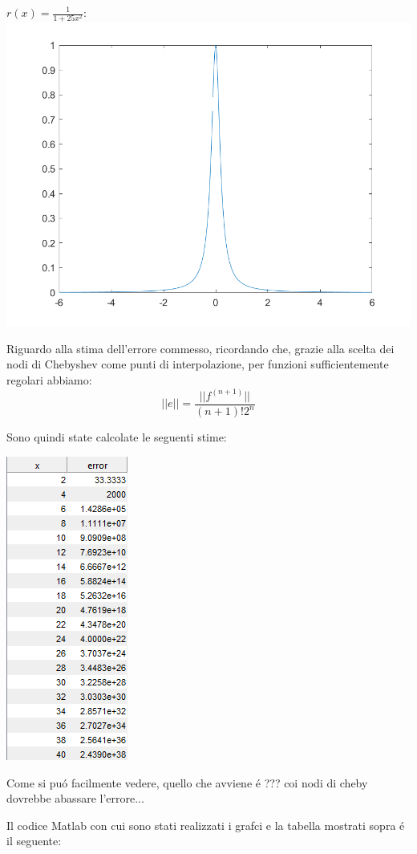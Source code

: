 \begin{center}
\scriptsize{\(r(x) = \frac{1}{1+25x^2}\):}\\
\includegraphics[scale=0.45]{cap4/4_7/runge.png}
\end{center}


\noindent Riguardo alla stima dell'errore commesso, ricordando che, grazie alla scelta dei nodi di Chebyshev come punti di interpolazione, per funzioni sufficientemente regolari abbiamo:
\[
||e|| = \frac{||f^{(n+1)}||}{(n+1)!2^n}
\]

\noindent Sono quindi state calcolate le seguenti stime:

\begin{center}
	\includegraphics[scale=0.5]{cap4/4_7/4_7_error.png}
\end{center}

\noindent Come si pu\'o facilmente vedere, quello che avviene \'e ??? coi nodi di cheby dovrebbe abassare l'errore...

\noindent Il codice Matlab con cui sono stati realizzati i grafci e la tabella mostrati sopra \'e il seguente:



